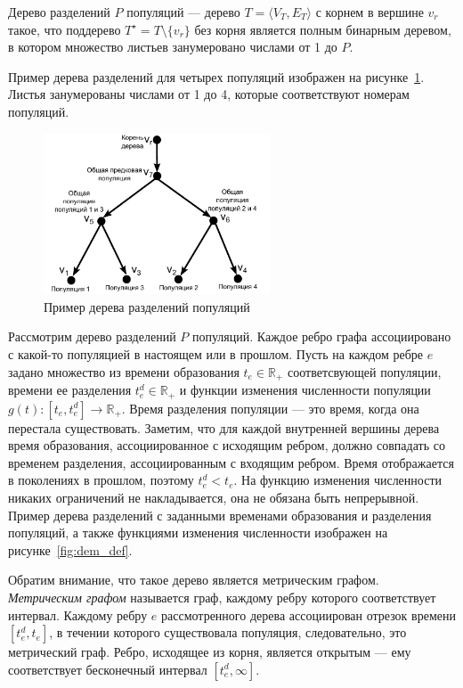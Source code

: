  Дерево разделений $P$ популяций --- дерево $T=\langle V_T, E_T \rangle$ с корнем в вершине $v_r$ такое, что поддерево $T^\star=T\setminus\{v_r\}$ без корня является полным бинарным деревом, в котором множество листьев занумеровано числами от 1 до $P$.

Пример дерева разделений для четырех популяций изображен на рисунке~\ref{fig:dem_tree}.
Листья занумерованы числами от 1 до 4, которые соответствуют номерам популяций.

\begin{figure}[ht]
    \centering
    \includegraphics[width=0.6\textwidth]{images_2/dem_hist_tree_2.pdf}
    \caption{Пример дерева разделений популяций}
    \label{fig:dem_tree}
\end{figure}

Рассмотрим дерево разделений $P$ популяций.
Каждое ребро графа ассоциировано с какой-то популяцией в настоящем или в прошлом.
Пусть на каждом ребре $e$ задано множество из времени образования $t_e \in \mathbb{R}_+$ соответсвующей популяции, времени ее разделения $t^d_e \in \mathbb{R}_+$ и функции изменения численности популяции $g(t): [t_e, t^d_e] \to \mathbb{R}_+$.
Время разделения популяции --- это время, когда она перестала существовать.
Заметим, что для каждой внутренней вершины дерева время образования, ассоциированное с исходящим ребром, должно совпадать со временем разделения, ассоциированным с входящим ребром.
Время отображается в поколениях в прошлом, поэтому $t^d_e < t_e$.
На функцию изменения численности никаких ограничений не накладывается, она не обязана быть непрерывной.
Пример дерева разделений с заданными временами образования и разделения популяций, а также функциями изменения численности изображен на рисунке~\ref{fig:dem_def}.

Обратим внимание, что такое дерево является метрическим графом.
\textit{Метрическим графом} называется граф, каждому ребру которого соответствует интервал.
Каждому ребру $e$ рассмотренного дерева ассоциирован отрезок времени $[t^d_e, t_e]$, в течении которого существовала популяция, следовательно, это метрический граф.
Ребро, исходящее из корня, является открытым --- ему соответствует бесконечный интервал $[t^d_e, \infty]$.


